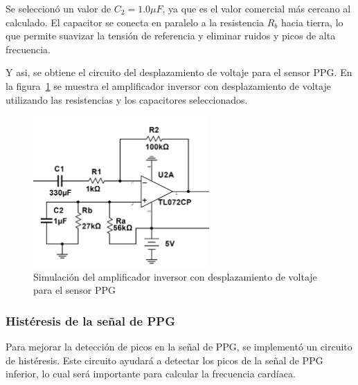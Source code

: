         Se seleccionó un valor de $C_2 = 1.0 \mu F$, ya que es el valor comercial más cercano al calculado. El capacitor se conecta en paralelo a la resistencia $R_b$ hacia tierra, lo que permite suavizar la tensión de referencia y eliminar ruidos y picos de alta frecuencia.

        Y asi, se obtiene el circuito del desplazamiento de voltaje para el sensor PPG. En la figura~\ref{fig:Simulacion_Amp_Inversor_PPG} se muestra el amplificador inversor con desplazamiento de voltaje utilizando las resistencias y los capacitores seleccionados.

        \begin{figure}[H]
            \centering
            \includegraphics[width=0.6\textwidth]{img/Desarrollo/multisim_AmpInversor_ppg.png}
            \caption[Simulación del amplificador inversor con desplazamiento de voltaje para el sensor PPG.]{Simulación del amplificador inversor con desplazamiento de voltaje para el sensor PPG\footnotemark}
            \label{fig:Simulacion_Amp_Inversor_PPG}
        \end{figure}

        \subsubsection{Histéresis de la señal de PPG}
        Para mejorar la detección de picos en la señal de PPG, se implementó un circuito de histéresis. Este circuito ayudará a detectar los picos de la señal de PPG inferior, lo cual será importante para calcular la frecuencia cardíaca. 

